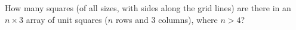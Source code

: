 How many squares (of all sizes, with sides along the grid lines) are there in an $n\times3$ array of unit squares ($n$ rows and $3$ columns), where $n>4$?
